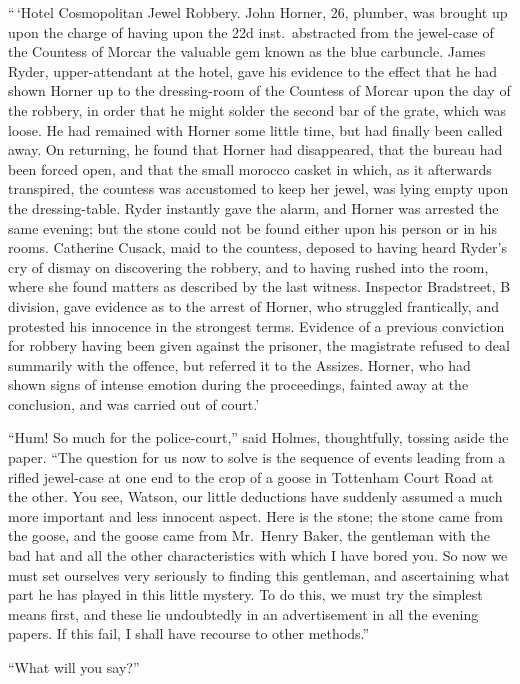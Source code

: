 “\,‘Hotel Cosmopolitan Jewel Robbery. John Horner, 26,
plumber, was brought up upon the charge of having upon the
22d inst.\ abstracted from the jewel-case of the Countess of
Morcar the valuable gem known as the blue carbuncle. James
Ryder, upper-attendant at the hotel, gave his evidence to the
effect that he had shown Horner up to the dressing-room of
the Countess of Morcar upon the day of the robbery, in order
that he might solder the second bar of the grate, which was
loose. He had remained with Horner some little time, but
had finally been called away. On returning, he found that
Horner had disappeared, that the bureau had been forced
open, and that the small morocco casket in which, as it afterwards
transpired, the countess was accustomed to keep her
jewel, was lying empty upon the dressing-table. Ryder instantly
gave the alarm, and Horner was arrested the same
evening; but the stone could not be found either upon his
person or in his rooms. Catherine Cusack, maid to the
countess, deposed to having heard Ryder’s cry of dismay on
discovering the robbery, and to having rushed into the room,
where she found matters as described by the last witness.
Inspector Bradstreet, B division, gave evidence as to the arrest
of Horner, who struggled frantically, and protested his
innocence in the strongest terms. Evidence of a previous
conviction for robbery having been given against the prisoner,
the magistrate refused to deal summarily with the offence, but
referred it to the Assizes. Horner, who had shown signs of
intense emotion during the proceedings, fainted away at the
conclusion, and was carried out of court.’

“Hum! So much for the police-court,” said Holmes,
thou\-ghtfully, tossing aside the paper. “The question for us
now to solve is the sequence of events leading from a rifled
jewel-case at one end to the crop of a goose in Tottenham
Court Road at the other. You see, Watson, our little deductions
have suddenly assumed a much more important and less
innocent aspect. Here is the stone; the stone came from the
goose, and the goose came from Mr.~Henry Baker, the gentleman
with the bad hat and all the other characteristics with
which I have bored you. So now we must set ourselves very
seriously to finding this gentleman, and ascertaining what part
he has played in this little mystery. To do this, we must try
the simplest means first, and these lie undoubtedly in an
advertisement in all the evening papers. If this fail, I shall have
recourse to other methods.”

“What will you say?”

